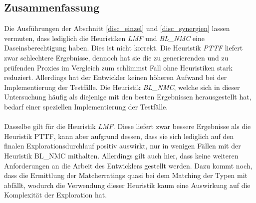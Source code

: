 \subsection{Zusammenfassung}
Die Ausführungen der Abschnitt \ref{disc_einzel} und \ref{disc_synergien} lassen vermuten, dass lediglich die Heuristiken \emph{LMF} und\emph{ BL\_NMC} eine Daseinsberechtigung haben. Dies ist nicht korrekt. Die Heuristik \emph{PTTF} liefert zwar schlechtere Ergebnisse, dennoch hat sie die zu generierenden und zu prüfenden Proxies im Vergleich zum schlimmst Fall ohne Heuristiken stark reduziert. Allerdings hat der Entwickler keinen höheren Aufwand bei der Implementierung der Testfälle. Die Heuristik \emph{BL\_NMC}, welche sich in dieser Untersuchung häufig als diejenige mit den besten Ergebnissen herausgestellt hat, bedarf einer speziellen Implementierung der Testfälle.
\\\\
Dasselbe gilt für die Heuristik \emph{LMF}. Diese liefert zwar bessere Ergebnisse als die Heuristik PTTF, kann aber aufgrund dessen, dass sie sich lediglich auf den finalen Explorationsdurchlauf positiv auswirkt, nur in wenigen Fällen mit der Heuristik BL\_NMC mithalten. Allerdings gilt auch hier, dass keine weiteren Anforderungen an die Arbeit des Entwicklers gestellt werden. Dazu kommt noch, dass die Ermittlung der Matcherratings quasi bei dem Matching der Typen mit abfällt, wodurch die Verwendung dieser Heuristik kaum eine Auswirkung auf die Komplexität der Exploration hat.

